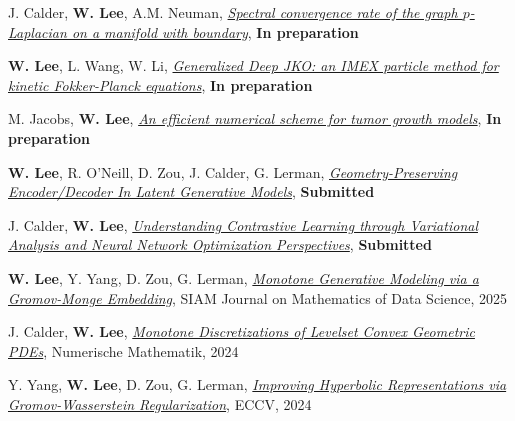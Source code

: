 

\begin{cvparagraph}

\vspace{0.5cm}
\begin{cvitems}
  \item J. Calder, \textbf{W. Lee}, A.M. Neuman, \href{}{\textit{Spectral convergence rate of the graph $p$-Laplacian on a manifold with boundary}}, \textbf{In preparation}
    \medskip
  \item \textbf{W. Lee}, L. Wang, W. Li, \href{}{\textit{Generalized Deep JKO: an IMEX particle method for kinetic Fokker-Planck equations}}, \textbf{In preparation}
  \medskip
  \item M. Jacobs, \textbf{W. Lee}, \href{}{\textit{An efficient numerical scheme for tumor growth models}}, \textbf{In preparation}
    \medskip
  \item \textbf{W. Lee}, R. O'Neill, D. Zou, J. Calder, G. Lerman, \href{https://arxiv.org/abs/2501.09876}{\textit{Geometry-Preserving Encoder/Decoder In Latent Generative Models}}, \textbf{Submitted} %
    \medskip
  \item J. Calder, \textbf{W. Lee}, \href{https://openreview.net/pdf?id=qjoDJjVZxB}{\textit{Understanding Contrastive Learning through Variational Analysis and Neural Network Optimization Perspectives}}, \textbf{Submitted}
    \medskip
  \item \textbf{W. Lee}, Y. Yang, D. Zou, G. Lerman, \href{https://epubs.siam.org/doi/10.1137/24M1673772}{\textit{Monotone Generative Modeling via a Gromov-Monge Embedding}}, SIAM Journal on Mathematics of Data Science, 2025
    \medskip
  \item J. Calder, \textbf{W. Lee}, \href{https://rdcu.be/dZfbw}{\textit{Monotone Discretizations of Levelset Convex Geometric PDEs}}, Numerische Mathematik, 2024
    \medskip
  \item Y. Yang, \textbf{W. Lee}, D. Zou, G. Lerman, \href{http://arxiv.org/abs/2407.10495}{\textit{Improving Hyperbolic Representations via Gromov-Wasserstein Regularization}}, ECCV, 2024

\end{cvitems}
\end{cvparagraph}

